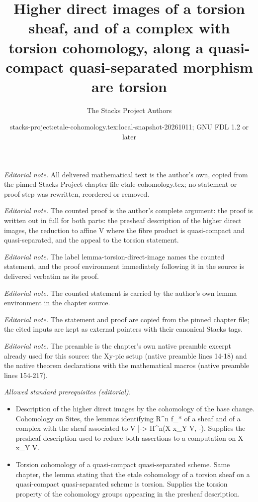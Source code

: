 \documentclass[10pt,a4paper]{amsart}
\title{Higher direct images of a torsion sheaf, and of a complex with torsion cohomology, along a quasi-compact quasi-separated morphism are torsion}
\author{The Stacks Project Authors}
\date{stacks-project:etale-cohomology.tex:local-snapshot-20261011; GNU FDL 1.2 or later}
\theoremstyle{plain}
\theoremstyle{definition}
\theoremstyle{remark}
\numberwithin{equation}{subsection}
\begin{document}
\maketitle
\noindent\textit{Editorial note.} All delivered mathematical text is the author's own, copied from the pinned Stacks Project chapter file etale-cohomology.tex; no statement or proof step was rewritten, reordered or removed.\par\medskip
\noindent\textit{Editorial note.} The counted proof is the author's complete argument: the proof is written out in full for both parts: the presheaf description of the higher direct images, the reduction to affine V where the fibre product is quasi-compact and quasi-separated, and the appeal to the torsion statement.\par\medskip
\noindent\textit{Editorial note.} The label lemma-torsion-direct-image names the counted statement, and the proof environment immediately following it in the source is delivered verbatim as its proof.\par\medskip
\noindent\textit{Editorial note.} The counted statement is carried by the author's own lemma environment in the chapter source.\par\medskip
\noindent\textit{Editorial note.} The statement and proof are copied from the pinned chapter file; the cited inputs are kept as external pointers with their canonical Stacks tags.\par\medskip
\noindent\textit{Editorial note.} The preamble is the chapter's own native preamble excerpt already used for this source: the Xy-pic setup (native preamble lines 14-18) and the native theorem declarations with the mathematical macros (native preamble lines 154-217).\par\medskip
\noindent\textit{Allowed standard prerequisites (editorial).}\begin{itemize}
\item Description of the higher direct images by the cohomology of the base change. Cohomology on Sites, the lemmas identifying R\textasciicircum{}n f\_* of a sheaf and of a complex with the sheaf associated to V |-> H\textasciicircum{}n(X x\_Y V, -). Supplies the presheaf description used to reduce both assertions to a computation on X x\_Y V.
\item Torsion cohomology of a quasi-compact quasi-separated scheme. Same chapter, the lemma stating that the etale cohomology of a torsion sheaf on a quasi-compact quasi-separated scheme is torsion. Supplies the torsion property of the cohomology groups appearing in the presheaf description.
\end{itemize}\medskip
\end{document}
